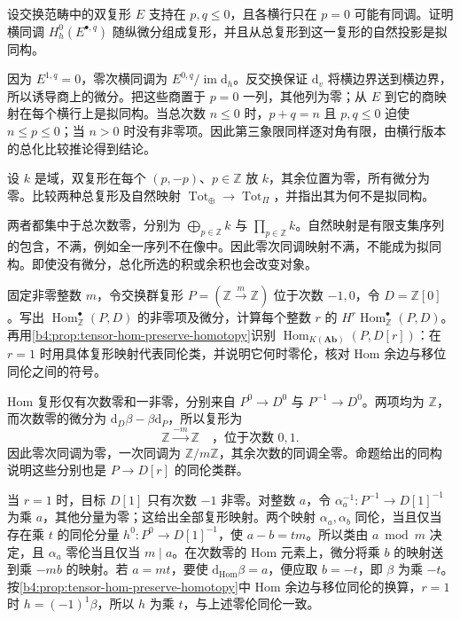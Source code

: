 \begin{exercise}\label{b4:ex:06-third-quadrant-edge}
	设交换范畴中的双复形 \(E\) 支持在 \(p,q\le0\)，且各横行只在 \(p=0\) 可能有同调。证明横同调 \(H_h^0(E^{\bullet,q})\) 随纵微分组成复形，并且从总复形到这一复形的自然投影是拟同构。
\end{exercise}
\begin{solution}
	因为 \(E^{1,q}=0\)，零次横同调为 \(E^{0,q}/\operatorname{im}\mathrm{d}_h\)。反交换保证 \(\mathrm{d}_v\) 将横边界送到横边界，所以诱导商上的微分。把这些商置于 \(p=0\) 一列，其他列为零；从 \(E\) 到它的商映射在每个横行上是拟同构。当总次数 \(n\le0\) 时，\(p+q=n\) 且 \(p,q\le0\) 迫使 \(n\le p\le0\)；当 \(n>0\) 时没有非零项。因此第三象限同样逐对角有限，由横行版本的总化比较推论得到结论。
\end{solution}

\begin{exercise}\label{b4:ex:06-infinite-diagonal-size}
	设 \(k\) 是域，双复形在每个 \((p,-p)\)、\(p\in\mathbb Z\) 放 \(k\)，其余位置为零，所有微分为零。比较两种总复形及自然映射 \(\operatorname{Tot}_{\oplus}\to\operatorname{Tot}_{\Pi}\)，并指出其为何不是拟同构。
\end{exercise}
\begin{solution}
	两者都集中于总次数零，分别为 \(\bigoplus_{p\in\mathbb Z}k\) 与 \(\prod_{p\in\mathbb Z}k\)。自然映射是有限支集序列的包含，不满，例如全一序列不在像中。因此零次同调映射不满，不能成为拟同构。即使没有微分，总化所选的积或余积也会改变对象。
\end{solution}

\begin{exercise}\label{b4:ex:06-hom-homotopies}
	固定非零整数 \(m\)，令交换群复形 \(P=(\mathbb Z\xrightarrow{m}\mathbb Z)\) 位于次数 \(-1,0\)，令 \(D=\mathbb Z[0]\)。写出 \(\operatorname{Hom}_{\mathbb Z}^\bullet(P,D)\) 的非零项及微分，计算每个整数 \(r\) 的 \(H^r\operatorname{Hom}_{\mathbb Z}^\bullet(P,D)\)。再用\cref{b4:prop:tensor-hom-preserve-homotopy}识别 \(\operatorname{Hom}_{K(\mathbf{Ab})}(P,D[r])\)：在 \(r=1\) 时用具体复形映射代表同伦类，并说明它何时零伦，核对 Hom 余边与移位同伦之间的符号。
\end{exercise}
\begin{solution}
	Hom 复形仅有次数零和一非零，分别来自 \(P^0\to D^0\) 与 \(P^{-1}\to D^0\)。两项均为 \(\mathbb Z\)，而次数零的微分为 \(\mathrm{d}_D\beta-\beta\mathrm{d}_P\)，所以复形为
	\[
		\mathbb Z\xrightarrow{-m}\mathbb Z \quad\text{，位于次数 }0,1.
	\]
	因此零次同调为零，一次同调为 \(\mathbb Z/m\mathbb Z\)，其余次数的同调全零。命题给出的同构说明这些分别也是 \(P\to D[r]\) 的同伦类群。

	当 \(r=1\) 时，目标 \(D[1]\) 只有次数 \(-1\) 非零。对整数 \(a\)，令 \(\alpha_a^{-1}:P^{-1}\to D[1]^{-1}\) 为乘 \(a\)，其他分量为零；这给出全部复形映射。两个映射 \(\alpha_a,\alpha_b\) 同伦，当且仅当存在乘 \(t\) 的同伦分量 \(h^0:P^0\to D[1]^{-1}\)，使 \(a-b=tm\)。所以类由 \(a\bmod m\) 决定，且 \(\alpha_a\) 零伦当且仅当 \(m\mid a\)。在次数零的 Hom 元素上，微分将乘 \(b\) 的映射送到乘 \(-mb\) 的映射。若 \(a=mt\)，要使 \(\mathrm{d}_{\mathrm{Hom}}\beta=a\)，便应取 \(b=-t\)，即 \(\beta\) 为乘 \(-t\)。按\cref{b4:prop:tensor-hom-preserve-homotopy}中 Hom 余边与移位同伦的换算，\(r=1\) 时 \(h=(-1)^1\beta\)，所以 \(h\) 为乘 \(t\)，与上述零伦同伦一致。
\end{solution}
